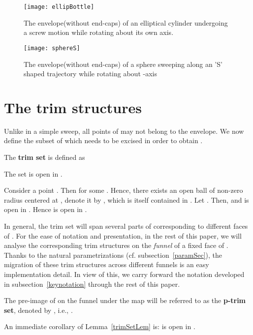 \documentclass{elsart5p}
\begin{document}
\begin{figure}
 \centering
 \texttt{[image: ellipBottle]}
 \caption{The envelope(without end-caps) of an elliptical cylinder undergoing a screw motion while rotating about 
its own axis.}
 \label{ellipBottleFig}
\end{figure}
\begin{figure}
 \centering
 \texttt{[image: sphereS]}
 \caption{The envelope(without end-caps) of a sphere sweeping along an 'S' shaped trajectory while rotating 
about -axis}
 \label{sphereSFig}
\end{figure}
\section{The trim structures}	\label{simpleSISec}

Unlike in a simple sweep, all points of  may not belong to the envelope.  We now define the 
subset of  which needs to be excised in order to obtain .
\begin{defn} \label{trimSetDef}
The {\bf trim set} is defined as 
 
\end{defn}

\begin{lem} \label{trimSetLem}
The set  is open in .
\end{lem}
  Consider a point .  Then  for some .  
Hence, there exists an open ball of non-zero radius  
centered at , denote it by , which is itself contained in .  
Let .
Then,  and   is open in . Hence  is open in .
\hfill 

In general, the trim set will span several parts of  corresponding 
to different faces of . For the ease of notation
and presentation, in the rest of this paper, we will analyse the corresponding
trim structures on the {\em funnel} of a fixed face  of .
Thanks to the natural parametrizations (cf. subsection~\ref{paramSec}), 
the migration of these trim structures across different funnels is an easy
implementation detail. In view of this, we carry forward the notation 
developed in subsection~\ref{keynotation} through the rest of this paper.

\begin{defn} \label{trimSetDef} 
The pre-image of  on the funnel under the map  will be 
referred to as the {\bf p-trim set}, denoted by , i.e., 
.
\end{defn}
An immediate corollary of Lemma~\ref{trimSetLem} is:
 is open in .
\end{document}
